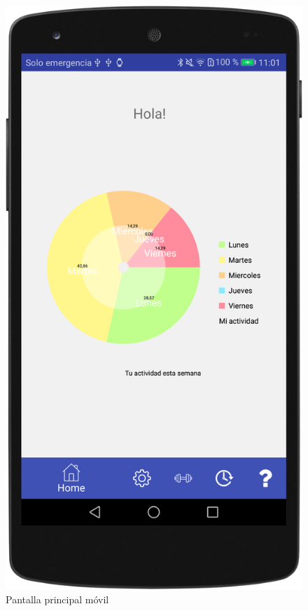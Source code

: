 \begin{figure}[H]
	\centering
	\includegraphics[scale=0.10]{imagenes/m2.png}
	\caption{Pantalla principal móvil}
	\label{Pantalla principal movil}
\end{figure}

